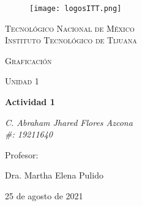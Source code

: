 \documentclass[letterpaper, 12pt]{article}
\begin{document}
    
    \begin{titlepage}
        \begin{figure}[ht]
            \centering
            \texttt{[image: logosITT.png]}
        \end{figure}
        \centering
        {\scshape\LARGE Tecnológico Nacional de México\\Instituto Tecnológico de Tijuana\par}
        \vspace{1cm}
        {\scshape\Large Graficación\par}
        \vspace{1cm}
        {\scshape\Large Unidad 1\par}
        \vspace{1.5cm}
        {\huge\bfseries Actividad 1\par}
        \vspace{2cm}
        {\Large\itshape C. Abraham Jhared Flores Azcona\\\#: 19211640\par}
        \vfill
        Profesor: \par
        Dra. Martha Elena Pulido
        
        \vfill

        {\large 25 de agosto de 2021}
    \end{titlepage}
\end{document}
